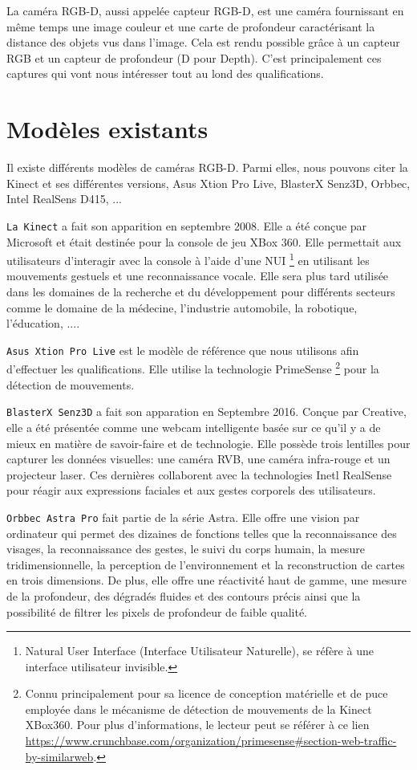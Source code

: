 \documentclass[a4paper, 12pt]{book}
\begin{document}
La caméra RGB-D, aussi appelée capteur RGB-D, est une caméra fournissant en même temps une image couleur et une carte de profondeur caractérisant la distance des objets vus dans l'image. Cela est rendu possible grâce à un capteur RGB et un capteur de profondeur (D pour Depth). C'est principalement ces captures qui vont nous intéresser tout au lond des qualifications.


\section{Modèles existants}
Il existe différents modèles de caméras RGB-D. Parmi elles, nous pouvons citer la Kinect et ses différentes versions, Asus Xtion Pro Live, BlasterX Senz3D, Orbbec, Intel RealSens D415, ...
\par \texttt{La Kinect} a fait son apparition en septembre 2008. Elle a été conçue par Microsoft et était destinée pour la console de jeu XBox 360. Elle permettait aux utilisateurs d'interagir avec la console à l'aide d'une NUI \footnote{Natural User Interface (Interface Utilisateur Naturelle), se réfère à une interface utilisateur invisible.} en utilisant les mouvements gestuels et une reconnaissance vocale. Elle sera plus tard utilisée dans les domaines de la  recherche et du développement pour différents secteurs comme le domaine de la médecine, l'industrie automobile, la robotique, l'éducation,  .... 
\par \texttt{Asus Xtion Pro Live} est le modèle de référence que nous utilisons afin d'effectuer les qualifications. Elle utilise la technologie PrimeSense  \footnote{Connu principalement pour sa licence de conception matérielle et de puce employée dans le mécanisme de détection de mouvements de la Kinect XBox360. Pour plus d'informations, le lecteur peut se référer à ce lien \url{https://www.crunchbase.com/organization/primesense#section-web-traffic-by-similarweb}.} pour la détection de mouvements.
\par \texttt{BlasterX Senz3D} a fait son apparation en Septembre 2016. Conçue par Creative,  elle a été présentée comme une webcam intelligente basée sur ce qu'il y a de mieux en matière de savoir-faire et de technologie. Elle possède trois lentilles pour capturer les données visuelles: une caméra RVB, une caméra infra-rouge et un projecteur laser. Ces dernières collaborent avec la technologies Inetl RealSense pour réagir aux expressions faciales et aux gestes corporels des utilisateurs.
\par \texttt{Orbbec Astra Pro} fait partie de la série Astra. Elle offre une vision par ordinateur qui permet des dizaines de fonctions telles que la reconnaissance des visages, la reconnaissance des gestes, le suivi du corps humain, la mesure tridimensionnelle, la perception de l'environnement et la reconstruction de cartes en trois dimensions. De plus, elle offre une réactivité haut de gamme, une mesure de la profondeur, des dégradés fluides et des contours précis ainsi que la possibilité de filtrer les pixels de profondeur de faible qualité.
\end{document}
